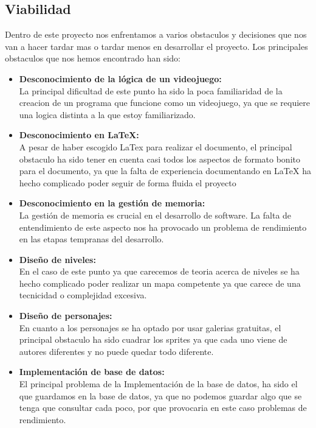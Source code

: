 \documentclass[a4paper]{article}
\begin{document}
\subsection{Viabilidad}
Dentro de este proyecto nos enfrentamos a varios obstaculos y decisiones que nos van a hacer tardar mas o tardar menos en desarrollar el proyecto.
Los principales obstaculos que nos hemos encontrado han sido:
\begin{itemize}
    \item \textbf{Desconocimiento de la lógica de un videojuego:} \\
          La principal dificultad de este punto ha sido la poca familiaridad de la creacion de un programa que funcione como un videojuego, ya que se requiere una logica distinta a la que estoy familiarizado.

    \item \textbf{Desconocimiento en LaTeX:} \\
          A pesar de haber escogido LaTex para realizar el documento, el principal obstaculo ha sido tener en cuenta casi todos los aspectos de formato bonito para el documento, ya que la falta de experiencia
          documentando en LaTeX ha hecho complicado poder seguir de forma fluida el proyecto

    \item \textbf{Desconocimiento en la gestión de memoria:} \\
          La gestión de memoria es crucial en el desarrollo de software. La falta de entendimiento de este aspecto nos ha provocado un problema de rendimiento en las etapas tempranas del desarrollo.

    \item \textbf{Diseño de niveles:} \\
          En el caso de este punto ya que carecemos de teoria acerca de niveles se ha hecho complicado poder realizar un mapa competente ya que carece de una tecnicidad o complejidad excesiva.

    \item \textbf{Diseño de personajes:} \\
          En cuanto a los personajes se ha optado por usar galerias gratuitas, el principal obstaculo ha sido cuadrar los sprites ya que cada uno viene de autores diferentes y no puede quedar todo diferente.

    \item \textbf{Implementación de base de datos:} \\
          El principal problema de la Implementación de la base de datos, ha sido el que guardamos en la base de datos, ya que no podemos guardar algo que se tenga que consultar cada poco, por que provocaria
          en este caso problemas de rendimiento.


\end{itemize}
\end{document}
